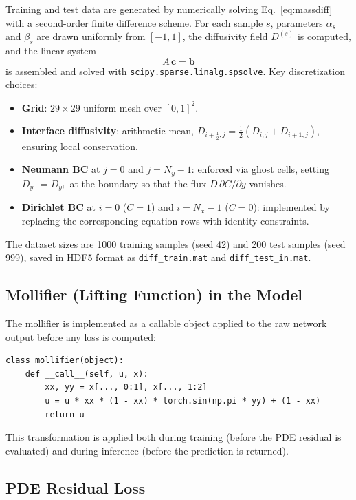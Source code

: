 \documentclass[11pt]{article}
\begin{document}
Training and test data are generated by numerically solving
Eq.~\eqref{eq:massdiff} with a second-order finite difference scheme.  For each
sample $s$, parameters $\alpha_s$ and $\beta_s$ are drawn uniformly from
$[-1,1]$, the diffusivity field $D^{(s)}$ is computed, and the linear system
\begin{equation}
  A\,\mathbf{c} = \mathbf{b}
\end{equation}
is assembled and solved with \texttt{scipy.sparse.linalg.spsolve}.  Key
discretization choices:
\begin{itemize}
  \item \textbf{Grid}: $29\times29$ uniform mesh over $[0,1]^2$.
  \item \textbf{Interface diffusivity}: arithmetic mean,
        $D_{i+\frac{1}{2},j} = \frac{1}{2}(D_{i,j}+D_{i+1,j})$, ensuring
        local conservation.
  \item \textbf{Neumann BC} at $j=0$ and $j=N_y-1$: enforced via ghost cells,
        setting $D_{y^-} = D_{y^+}$ at the boundary so that the flux
        $D\,\partial C/\partial y$ vanishes.
  \item \textbf{Dirichlet BC} at $i=0$ ($C=1$) and $i=N_x-1$ ($C=0$):
        implemented by replacing the corresponding equation rows with identity
        constraints.
\end{itemize}
The dataset sizes are 1000 training samples (seed 42) and 200 test samples
(seed 999), saved in HDF5 format as \texttt{diff\_train.mat} and
\texttt{diff\_test\_in.mat}.

\subsection{Mollifier (Lifting Function) in the Model}

The mollifier is implemented as a callable object applied to the raw network
output before any loss is computed:

\begin{lstlisting}
class mollifier(object):
    def __call__(self, u, x):
        xx, yy = x[..., 0:1], x[..., 1:2]
        u = u * xx * (1 - xx) * torch.sin(np.pi * yy) + (1 - xx)
        return u
\end{lstlisting}

\noindent This transformation is applied both during training (before the PDE
residual is evaluated) and during inference (before the prediction is
returned).

\subsection{PDE Residual Loss}
\end{document}
